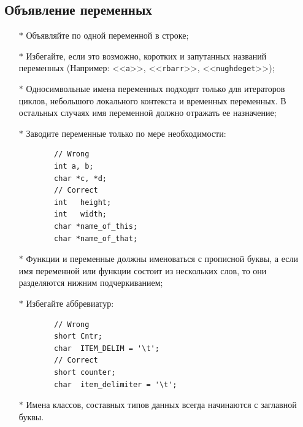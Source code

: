 \documentclass[12pt, twoside]{report}
\begin{document}
\subsection*{Объявление переменных}\label{lab_work_formatting_variables}
\begin{itemize}
	\item [$*$] Объявляйте по одной переменной в строке;
	\item [$*$] Избегайте, если это возможно, коротких и запутанных названий переменных (Например: <<\texttt{a}>>, <<\texttt{rbarr}>>, <<\texttt{nughdeget}>>);
	\item [$*$] Односимвольные имена переменных подходят только для итераторов циклов, небольшого локального контекста и временных переменных. В остальных случаях имя переменной должно отражать ее назначение;
	\item [$*$] Заводите переменные только по мере необходимости:
	\begin{lstlisting}
		// Wrong
		int a, b;
		char *c, *d;
		// Correct
		int   height;
		int   width;
		char *name_of_this;
		char *name_of_that;
	\end{lstlisting}
	\item [$*$] Функции и переменные должны именоваться с прописной буквы, а если имя переменной или функции состоит из нескольких слов, то они разделяются нижним подчеркиванием;
	\item [$*$] Избегайте аббревиатур:
	\begin{lstlisting}
		// Wrong
		short Cntr;
		char  ITEM_DELIM = '\t';
		// Correct
		short counter;
		char  item_delimiter = '\t';
	\end{lstlisting}
\item [$*$] Имена классов, составных типов данных всегда начинаются с заглавной буквы.
\end{itemize}
\end{document}
